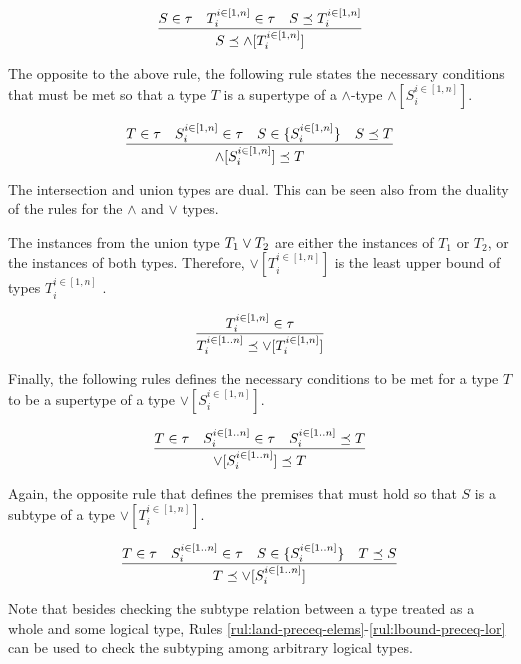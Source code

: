 \documentclass[runningheads]{llncs}
\begin{document}
\begin{equation}
\label{rul:lbound-preceq-land}
\dfrac{S\in\tau\quad\/T_i^{i\in[1,n]}\in\tau\quad\/S\preceq\/T_i^{i\in[1,n]}}
      {S\preceq\land[T_i^{i\in[1,n]}]}  
\end{equation} 

The opposite to the above rule, the following rule states the
necessary conditions that must be met so that a type $T$ is a
supertype of a $\land$-type $\land[S_i^{i\in[1,n]}]$.

\begin{equation}
\label{rul:land-preceq-ubound}
\dfrac{T\in\tau\quad\/S_i^{i\in[1,n]}\in\tau\quad\/S\in\{S_i^{i\in[1,n]}\}\quad\/S\preceq\/T}
      {\land[S_i^{i\in[1,n]}]\preceq\/T}  
\end{equation} 

The intersection and union types are dual. This can be seen also from
the duality of the rules for the $\land$ and $\lor$ types.

The instances from the union type $T_1\lor\/T_2$ are either the
instances of $T_1$ or $T_2$, or the instances of both
types. Therefore, $\lor[T_i^{i\in[1,n]}]$ is the least upper bound of
types $T_i^{i\in[1,n]}$ \cite{Pierce1991}.

\begin{equation}
\label{rul:lor-preceq-elems}
\dfrac{T_i^{i\in[1,n]}\in\tau}
      {T_i^{i\in[1..n]}\preceq\/\lor[T_i^{i\in[1,n]}]}
\end{equation}

Finally, the following rules defines the necessary conditions to be
met for a type $T$ to be a supertype of a type
$\lor[S_i^{i\in[1,n]}]$.

\begin{equation}
\label{rul:lor-preceq-ubound}
\dfrac{T\in\tau\quad\/S_i^{i\in[1..n]}\in\tau\quad\/S_i^{i\in[1..n]}\preceq\/T}
      {\lor[S_i^{i\in[1..n]}]\preceq\/T}  
\end{equation}

Again, the opposite rule that defines the premises that must hold so
that $S$ is a subtype of a type $\lor[T_i^{i\in[1,n]}]$.

\begin{equation}
\label{rul:lbound-preceq-lor}
\dfrac{T\in\tau\quad\/S_i^{i\in[1..n]}\in\tau\quad\/S\in\{S_i^{i\in[1..n]}\}\quad\/T\preceq\/S}
      {T\preceq\lor[S_i^{i\in[1..n]}]}  
\end{equation}

Note that besides checking the subtype relation between a type treated
as a whole and some logical type, Rules
\ref{rul:land-preceq-elems}-\ref{rul:lbound-preceq-lor} can be used to
check the subtyping among arbitrary logical types.
\end{document}
